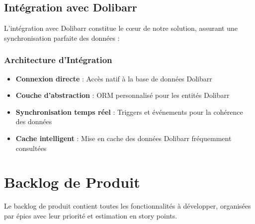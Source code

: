 \documentclass[12pt,a4paper]{report}
\begin{document}
\subsection{Intégration avec Dolibarr}
L'intégration avec Dolibarr constitue le cœur de notre solution, assurant une synchronisation parfaite des données :

\subsubsection{Architecture d'Intégration}
\begin{itemize}
    \item \textbf{Connexion directe} : Accès natif à la base de données Dolibarr
    \item \textbf{Couche d'abstraction} : ORM personnalisé pour les entités Dolibarr
    \item \textbf{Synchronisation temps réel} : Triggers et événements pour la cohérence des données
    \item \textbf{Cache intelligent} : Mise en cache des données Dolibarr fréquemment consultées
\end{itemize}



\section{Backlog de Produit}
Le backlog de produit contient toutes les fonctionnalités à développer, organisées par épics avec leur priorité et estimation en story points.
\end{document}
